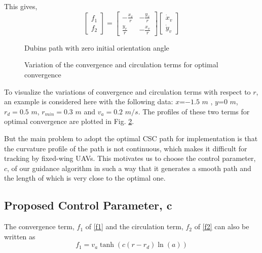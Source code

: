 \documentclass[Afour,sagev,times]{sagej}
\begin{document}
This gives,
\begin{equation}\label{eq16}
\begin{bmatrix}
f_{1}\\ f_{2}
\end{bmatrix}=\begin{bmatrix}
-\frac{x_v}{r} & -\frac{y_v}{r}\\ 
\frac{y_v}{r} & -\frac{x_v}{r}
\end{bmatrix}\begin{bmatrix}
\dot{x}_v \\  \dot{y}_v
\end{bmatrix}
\end{equation}

\begin{figure}[t!]
	\centering
	\caption{ Dubins path with zero initial orientation angle}
	\label{fig:dubin}
\end{figure}


\begin{figure}[t!]
	\centering
	\caption{Variation of the convergence and circulation terms for optimal convergence}
	\label{fig:conn}
\end{figure}

To visualize the variations of convergence and circulation terms with respect to $r$, an example is considered here with the following data: $x$=$-1.5$ $m$ , $y$=$0$ $m$, $r_{d}=0.5$ $m$, $r_{min}=0.3$ $m$ and  $v_a=0.2$ $m/s$.  The profiles of these two terms for optimal convergence are plotted in Fig. \ref{fig:conn}.

But the main problem to adopt the optimal CSC path for implementation is that the curvature profile of the path is not continuous, which makes it difficult for tracking by fixed-wing UAVs. This motivates us to choose the control parameter, $c$, of our guidance algorithm in such a way that it generates a smooth path and the length of which is very close to the optimal one.


 \subsection{ Proposed Control Parameter, c}

The convergence term, ${f_1}$  of \eqref{f1} and the circulation term, ${f_2}$  of \eqref{f2} can also be written as
\begin{equation}
{f_1} = v_{a}\tanh (c(r - {r_d})\ln (a))
\end{equation}
\end{document}
